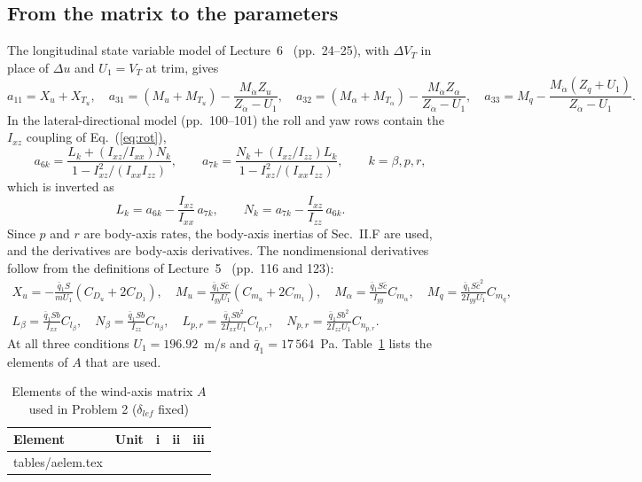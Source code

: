 \documentclass[conf]{new-aiaa}
\makeatletter
\newcommand\tabinput[1]{\@@input #1 }
\makeatother
\begin{document}
\subsection{From the matrix to the parameters}
The longitudinal state variable model of Lecture~6~\cite{lec6} (pp.~24--25), with $\Delta V_T$ in place of $\Delta u$ and $U_1=V_T$ at trim, gives
\begin{equation}
a_{11}=X_u+X_{T_u},\quad
a_{31}=(M_u+M_{T_u})-\frac{M_{\dot\alpha}Z_u}{Z_{\dot\alpha}-U_1},\quad
a_{32}=(M_\alpha+M_{T_\alpha})-\frac{M_{\dot\alpha}Z_\alpha}{Z_{\dot\alpha}-U_1},\quad
a_{33}=M_q-\frac{M_{\dot\alpha}(Z_q+U_1)}{Z_{\dot\alpha}-U_1}.
\end{equation}
In the lateral-directional model (pp.~100--101) the roll and yaw rows contain the $I_{xz}$ coupling of Eq.~(\ref{eq:rot}),
\begin{equation}
a_{6k}=\frac{L_k+(I_{xz}/I_{xx})N_k}{1-I_{xz}^2/(I_{xx}I_{zz})},\qquad
a_{7k}=\frac{N_k+(I_{xz}/I_{zz})L_k}{1-I_{xz}^2/(I_{xx}I_{zz})},\qquad k=\beta,p,r,
\end{equation}
which is inverted as
\begin{equation}
L_k=a_{6k}-\frac{I_{xz}}{I_{xx}}\,a_{7k},\qquad N_k=a_{7k}-\frac{I_{xz}}{I_{zz}}\,a_{6k}.
\label{eq:invert}
\end{equation}
Since $p$ and $r$ are body-axis rates, the body-axis inertias of Sec.~II.F are used, and the derivatives are body-axis derivatives. The nondimensional derivatives follow from the definitions of Lecture~5~\cite{lec5} (pp.~116 and 123):
\begin{gather}
X_u=-\frac{\bar q_1S}{mU_1}(C_{D_u}+2C_{D_1}),\quad
M_u=\frac{\bar q_1S\bar c}{I_{yy}U_1}(C_{m_u}+2C_{m_1}),\quad
M_\alpha=\frac{\bar q_1S\bar c}{I_{yy}}C_{m_\alpha},\quad
M_q=\frac{\bar q_1S\bar c^2}{2I_{yy}U_1}C_{m_q},\\
L_\beta=\frac{\bar q_1Sb}{I_{xx}}C_{l_\beta},\quad
N_\beta=\frac{\bar q_1Sb}{I_{zz}}C_{n_\beta},\quad
L_{p,r}=\frac{\bar q_1Sb^2}{2I_{xx}U_1}C_{l_{p,r}},\quad
N_{p,r}=\frac{\bar q_1Sb^2}{2I_{zz}U_1}C_{n_{p,r}}.
\end{gather}
At all three conditions $U_1=196.92$~m/s and $\bar q_1=17\,564$~Pa. Table~\ref{tab:aelem} lists the elements of $A$ that are used.

\begin{table}[hbt!]
\caption{\label{tab:aelem} Elements of the wind-axis matrix $A$ used in Problem 2 ($\delta_{lef}$ fixed)}
\centering
\begin{tabular}{llccc}
\toprule
Element & Unit & i & ii & iii \\
\midrule
\tabinput{tables/aelem.tex}
\bottomrule
\end{tabular}
\end{table}
\end{document}
